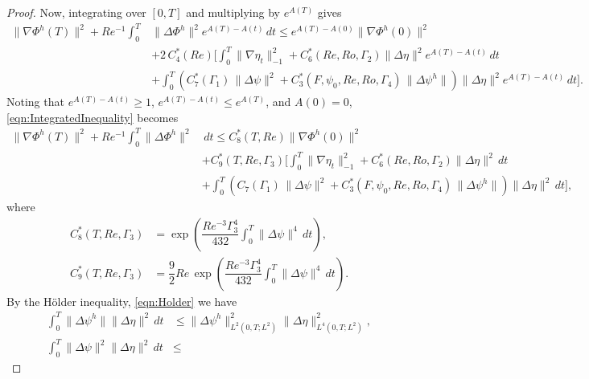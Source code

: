 \begin{proof}
  Now, integrating over $[0,T]$ and multiplying by $e^{A(T)}$ gives
  \begin{equation}
    \begin{split}
      \|\nabla \Phi^h(T)\|^2 + Re^{-1} \int_0^T\! &\|\Delta \Phi^h\|^2
        e^{A(T) - A(t)}\, dt \le e^{A(T) - A(0)} \|\nabla \Phi^h(0)\|^2 \\
      & + 2\, C^*_4(Re)\biggl[ \int_0^T\! \|\nabla \eta_t\|_{-1}^2
        + C^*_6(Re,Ro,\Gamma_2) \|\Delta \eta\|^2 e^{A(T) - A(t)}\, dt \\
      & + \int_0^T\!  \left( C^*_7(\Gamma_1)\, \|\Delta \psi\|^2
        +  C^*_3(F,\psi_0,Re,Ro,\Gamma_4)\,\|\Delta \psi^h\|\right)
        \|\Delta \eta\|^2 e^{A(T) - A(t)}\, dt\biggr].
    \end{split}
    \label{eqn:IntegratedInequality}
  \end{equation}
  Noting that $e^{A(T) - A(t)} \ge 1$, $e^{A(T) - A(t)} \le e^{A(T)}$, and
  $A(0) = 0$, \eqref{eqn:IntegratedInequality} becomes
  \begin{equation}
    \begin{split}
      \|\nabla \Phi^h(T)\|^2 + Re^{-1} \int_0^T\! \|\Delta \Phi^h\|^2 &\, dt
        \le C^*_8(T,Re) \|\nabla \Phi^h(0)\|^2 \\
      & + C^*_9(T,Re,\Gamma_3)\biggl[ \int_0^T\! \|\nabla \eta_t\|_{-1}^2
        + C^*_6(Re,Ro,\Gamma_2) \|\Delta \eta\|^2\, dt \\
      & + \int_0^T\!  \left( C_7(\Gamma_1)\, \|\Delta \psi\|^2
        + C^*_3(F,\psi_0,Re,Ro,\Gamma_4)\,\|\Delta \psi^h\|\right)
        \|\Delta \eta\|^2\, dt\biggr],
    \end{split} \label{eqn:CTREInequality}
  \end{equation}
  where
  \begin{align}
    C^*_8(T,Re,\Gamma_3) &= \exp\!\left(\dfrac{Re^{-3}\Gamma_3^4}{432}
      \int_{0}^{T}\!\|\Delta \psi\|^4\, dt\right), \label{eqn:C1TRe} \\
    C^*_9(T,Re,\Gamma_3) &= \dfrac{9}{2} Re\, \exp\!\left(\dfrac{Re^{-3}\Gamma_3^4}{432}
      \int_{0}^{T}\!\|\Delta \psi\|^4\, dt\right). \label{eqn:C2TRe}
  \end{align}
  By the H\"older inequality, \eqref{eqn:Holder} we have
  \begin{align}
    \int_0^T\! \|\Delta \psi^h\| \|\Delta \eta\|^2\, dt &\le
      \|\Delta \psi^h\|^2_{L^2(0,T;L^2)} \|\Delta \eta\|^2_{L^4(0,T;L^2)},
    \label{eqn:HolderPsih} \\
    \int_0^T\! \|\Delta \psi\|^2 \|\Delta \eta\|^2\, dt &\le

\end{align}
\end{proof}
